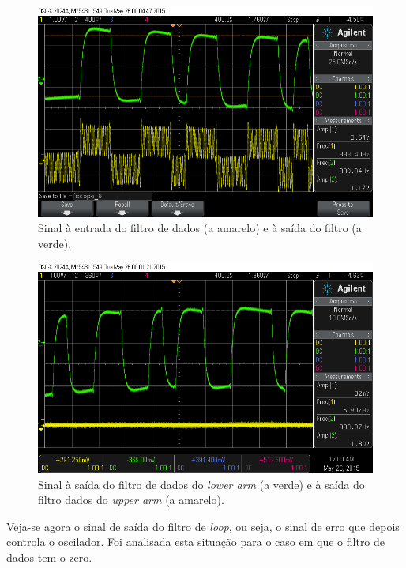 \documentclass[11pt]{article}
\numberwithin{equation}{section}
\begin{document}
{\begin{figure}[H]
	\centering
	\includegraphics[keepaspectratio=true, scale=0.37]{exps/ineoutdofiltro}
	\caption{Sinal à entrada do filtro de dados (a amarelo) e à saída do filtro (a verde).}
	\vspace{-0.8em}
\end{figure}


\begin{figure}[H]
	\centering
	\includegraphics[keepaspectratio=true, scale=0.37]{exps/upperandlowerarm}
	\caption{Sinal à saída do filtro de dados do \textit{lower arm} (a verde) e à saída do filtro dados do \textit{upper arm} (a amarelo).}
	\vspace{-0.8em}
\end{figure}


Veja-se agora o sinal de saída do filtro de \textit{loop}, ou seja, o sinal de erro que depois controla o oscilador. Foi analisada esta situação para o caso em que o filtro de dados tem o zero. 

}
\end{document}
